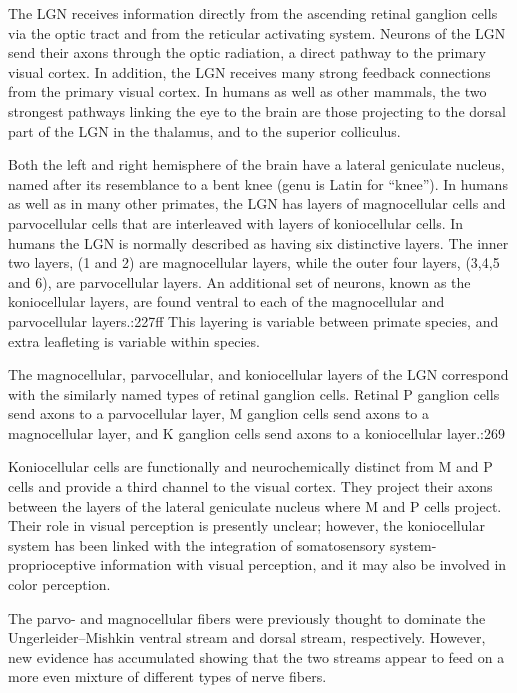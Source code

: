 The LGN receives information directly from the ascending retinal ganglion cells via the optic tract and from the reticular activating system. Neurons of the LGN send their axons through the optic radiation, a direct pathway to the primary visual cortex. In addition, the LGN receives many strong feedback connections from the primary visual cortex. In humans as well as other mammals, the two strongest pathways linking the eye to the brain are those projecting to the dorsal part of the LGN in the thalamus, and to the superior colliculus.

Both the left and right hemisphere of the brain have a lateral geniculate nucleus, named after its resemblance to a bent knee (genu is Latin for ``knee''). In humans as well as in many other primates, the LGN has layers of magnocellular cells and parvocellular cells that are interleaved with layers of koniocellular cells. In humans the LGN is normally described as having six distinctive layers. The inner two layers, (1 and 2) are magnocellular layers, while the outer four layers, (3,4,5 and 6), are parvocellular layers. An additional set of neurons, known as the koniocellular layers, are found ventral to each of the magnocellular and parvocellular layers.:227ff This layering is variable between primate species, and extra leafleting is variable within species.

The magnocellular, parvocellular, and koniocellular layers of the LGN correspond with the similarly named types of retinal ganglion cells. Retinal P ganglion cells send axons to a parvocellular layer, M ganglion cells send axons to a magnocellular layer, and K ganglion cells send axons to a koniocellular layer.:269

Koniocellular cells are functionally and neurochemically distinct from M and P cells and provide a third channel to the visual cortex. They project their axons between the layers of the lateral geniculate nucleus where M and P cells project. Their role in visual perception is presently unclear; however, the koniocellular system has been linked with the integration of somatosensory system-proprioceptive information with visual perception, and it may also be involved in color perception.

The parvo- and magnocellular fibers were previously thought to dominate the Ungerleider--Mishkin ventral stream and dorsal stream, respectively. However, new evidence has accumulated showing that the two streams appear to feed on a more even mixture of different types of nerve fibers.

